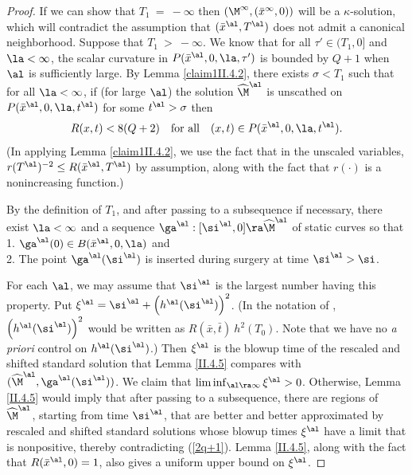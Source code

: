 \begin{proof}

If we can show that
$T_1 \: = \: -\infty$ then $(\M^\infty,(\bar x^\infty,0))$
will be a $\kappa$-solution, which will contradict the assumption
that $(\bar x^\al,T^\al)$ does not admit a canonical neighborhood.
Suppose that $T_1 \: > \: -\infty$.
We know that for all
$\tau' \in (T_1, 0]$
and $\la<\infty$, the scalar curvature in $P(\bar x^\al,0,\la,\tau')$
is bounded by $Q+1$ when $\al$ is sufficiently large.  By
Lemma \ref{claim1II.4.2}, there exists $\sigma< T_1$ such that for all
$\la<\infty$, if (for large $\al$)
the solution $\widehat\M^\al$ is unscathed on
$P(\bar x^\al,0,\la,t^\al)$ for some $t^\al > \sigma$ then
\begin{equation}
\label{2q+1}
R(x,t)< 8(Q+2)\quad\mbox{for all}\quad (x,t)\in P(\bar x^\al,0,\la,t^\al).
\end{equation}
(In applying Lemma \ref{claim1II.4.2}, we use the fact that in the unscaled
variables,
$r(T^\al)^{-2} \le R(\bar x^\al,T^\al)$ by assumption, along with
the fact that $r(\cdot)$ is a nonincreasing function.)


By the definition of $T_1$, and after passing
to a subsequence if necessary, there exist $\la<\infty$ and a sequence
$\ga^\al:[\si^\al,0]\ra\widehat\M^\al$  of static curves so that  \\
1. $\ga^\al(0)\in B(\bar x^\al,0,\la)$ and \\
2. The point
$\ga^\al(\si^\al)$ is inserted during surgery at time $\si^\al>\si$.

For each $\al$, we may assume that $\si^\al$ is the largest number having
this property.
Put
$\xi^\al= \si^\al+\left( h^\al(\si^\al)\right)^2$.
(In the notation of \cite{Perelman2},
$\left( h^\al(\si^\al)\right)^2$ would be written
as $R(\bar x, \bar t) \: h^2(T_0)$. Note that we have no {\it a priori} control
on $h^\al(\si^\al)$.) Then $\xi^\al$
is the blowup time of the rescaled and shifted
standard solution that Lemma \ref{II.4.5}
compares with $(\widehat\M^\al,\ga^\al(\si^\al))$.  We claim
that $\liminf_{\al\ra\infty}\xi^\al>0$. Otherwise, Lemma
\ref{II.4.5} would imply that after passing to a subsequence,
there are regions of
$\widehat\M^\al$, starting from time $\si^\al$, that are better and better
approximated by rescaled and shifted standard solutions whose blowup times
$\xi^\al$ have a limit that is nonpositive,
thereby contradicting (\ref{2q+1}). Lemma \ref{II.4.5}, along with
the fact that $R({\bar x}^\al, 0) = 1$, also gives a uniform upper bound
on $\xi^\al$.


\end{proof}
